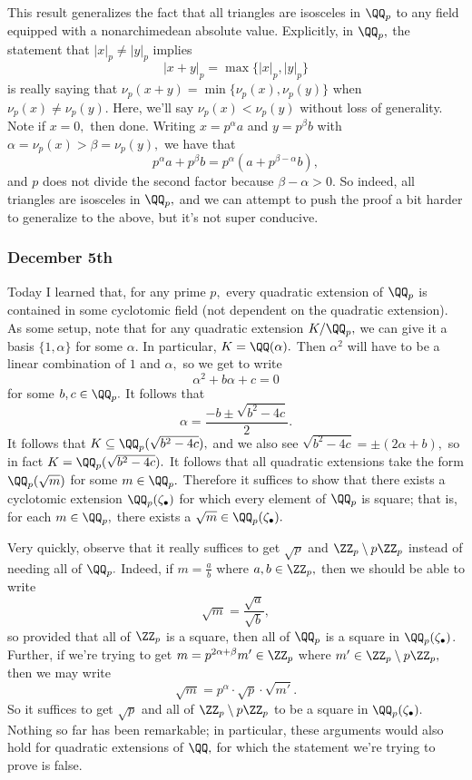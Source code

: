 This result generalizes the fact that all triangles are isosceles in $\QQ_p$ to any field equipped with a nonarchimedean absolute value. Explicitly, in $\QQ_p,$ the statement that $|x|_p\ne|y|_p$ implies
\[|x+y|_p=\max\{|x|_p,|y|_p\}\]
is really saying that $\nu_p(x+y)=\min\{\nu_p(x),\nu_p(y)\}$ when $\nu_p(x)\ne\nu_p(y).$ Here, we'll say $\nu_p(x)<\nu_p(y)$ without loss of generality. Note if $x=0,$ then done. Writing $x=p^\alpha a$ and $y=p^\beta b$ with $\alpha=\nu_p(x)>\beta=\nu_p(y),$ we have that
\[p^\alpha a+p^\beta b=p^\alpha\left(a+p^{\beta-\alpha}b\right),\]
and $p$ does not divide the second factor because $\beta-\alpha>0.$ So indeed, all triangles are isosceles in $\QQ_p,$ and we can attempt to push the proof a bit harder to generalize to the above, but it's not super conducive.

\subsubsection{December 5th}
Today I learned that, for any prime $p,$ every quadratic extension of $\QQ_p$ is contained in some cyclotomic field (not dependent on the quadratic extension). As some setup, note that for any quadratic extension $K/\QQ_p,$ we can give it a basis $\{1,\alpha\}$ for some $\alpha.$ In particular, $K=\QQ(\alpha).$ Then $\alpha^2$ will have to be a linear combination of $1$ and $\alpha,$ so we get to write
\[\alpha^2+b\alpha+c=0\]
for some $b,c\in\QQ_p.$ It follows that
\[\alpha=\frac{-b\pm\sqrt{b^2-4c}}2.\]
It follows that $K\subseteq\QQ_p(\sqrt{b^2-4c}),$ and we also see $\sqrt{b^2-4c}=\pm(2\alpha+b),$ so in fact $K=\QQ_p(\sqrt{b^2-4c}).$ It follows that all quadratic extensions take the form $\QQ_p(\sqrt m)$ for some $m\in\QQ_p.$ Therefore it suffices to show that there exists a cyclotomic extension $\QQ_p(\zeta_\bullet)$ for which every element of $\QQ_p$ is square; that is, for each $m\in\QQ_p,$ there exists a $\sqrt m\in\QQ_p(\zeta_\bullet).$

Very quickly, observe that it really suffices to get $\sqrt p$ and $\ZZ_p\setminus p\ZZ_p$ instead of needing all of $\QQ_p.$ Indeed, if $m=\frac ab$ where $a,b\in\ZZ_p,$ then we should be able to write
\[\sqrt m=\frac{\sqrt a}{\sqrt b},\]
so provided that all of $\ZZ_p$ is a square, then all of $\QQ_p$ is a square in $\QQ_p(\zeta_\bullet)$. Further, if we're trying to get $m=p^{2\alpha+\beta}m'\in\ZZ_p$ where $m'\in\ZZ_p\setminus p\ZZ_p,$ then we may write
\[\sqrt m=p^\alpha\cdot\sqrt p\cdot\sqrt{m'}.\]
So it suffices to get $\sqrt p$ and all of $\ZZ_p\setminus p\ZZ_p$ to be a square in $\QQ_p(\zeta_\bullet).$ Nothing so far has been remarkable; in particular, these arguments would also hold for quadratic extensions of $\QQ,$ for which the statement we're trying to prove is false.

